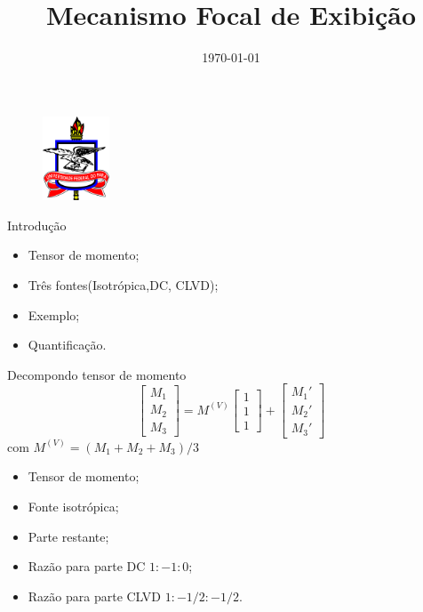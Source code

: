 \documentclass{beamer}
\title[Seminário]{Mecanismo Focal de Exibição} %
\author{} %
\institute[UFPA] %
{
	Professor: Jessé Costa\\
Universidade Federal do Pará \\ %
\medskip
}
\date{\today} %
\begin{document}
 \begin{frame}
\begin{figure}[htb]
\centering
\includegraphics[width= 2cm, height= 2.5cm]{logo.jpg}
\end{figure}

\titlepage
\end{frame}

\begin{frame}{Introdução}
	\begin{itemize}
		\item Tensor de momento;
		\item Três fontes(Isotrópica,DC, CLVD);
		\item Exemplo;
		\item Quantificação.
	\end{itemize}
\end{frame}

\begin{frame}{Decompondo tensor de momento}
	\justifying
	\begin{equation}
    \begin{bmatrix}
    M_1 \\
    M_2 \\
    M_3
    \end{bmatrix} = M^{(V)}\begin{bmatrix}
    1 \\
    1 \\
    1
    \end{bmatrix} +
    \begin{bmatrix}
    M_1' \\
    M_2 '\\
    M_3'
    \end{bmatrix}
    \nonumber
	\end{equation} 
	com $M^{(V)}= (M_1 + M_2 + M_3)/3$
	\begin{itemize}
	\item Tensor de momento;
	\item Fonte isotrópica;
	\item Parte restante;
	\item Razão para parte DC $1:-1:0$;
	\item Razão para parte CLVD $1:-1/2:-1/2$.
	\end{itemize}
\end{frame}
\end{document}
